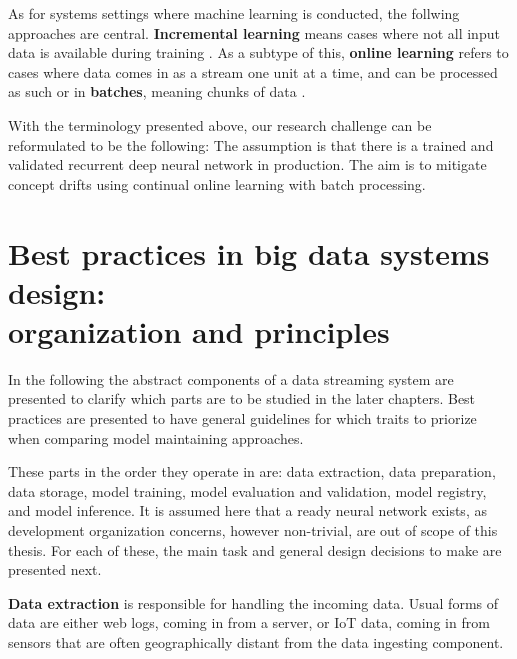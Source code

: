 As for systems settings where machine learning is conducted, the follwing approaches are central. \textbf{Incremental learning} means cases where not all input data is available during training \cite{giraud-carrier_note_2000}. As a subtype of this, \textbf{online learning} refers to cases where data comes in as a stream one unit at a time, and can be processed as such or in \textbf{batches}, meaning chunks of data \cite{conceptdriftsurvey}.

With the terminology presented above, our research challenge can be reformulated to be the following: The assumption is that there is a trained and validated recurrent deep neural network in production. The aim is to mitigate concept drifts using continual online learning with batch processing. 



\section[Best practices in big data systems design: organization and principles]{Best practices in big data systems design:\\ organization and principles}

In the following the abstract components of a data streaming system are presented to clarify which parts are to be studied in the later chapters. Best practices are presented to have general guidelines for which traits to priorize when comparing model maintaining approaches.

These parts in the order they operate in are: data extraction, data preparation, data storage, model training, model evaluation and validation, model registry, and model inference. It is assumed here that a ready neural network exists, as development organization concerns, however non-trivial, are out of scope of this thesis. For each of these, the main task and general design decisions to make are presented next.

\textbf{Data extraction} is responsible for handling the incoming data. Usual forms of data are either web logs, coming in from a server, or IoT data, coming in from sensors that are often geographically distant from the data ingesting component.


